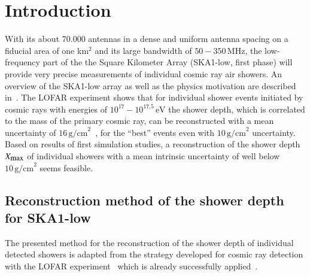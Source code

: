 \documentclass[epj]{webofc}
\newcommand*{\seclab}[1]{\label{sec:#1}}
\begin{document}
\section{Introduction}
\label{intro}
\vspace{-0.17cm}
With its about 70.000 antennas in a dense and uniform antenna spacing on a fiducial area of one km$^2$ and its large bandwidth of $50-350\,\mbox{MHz}$, the low-frequency part of
the the Square Kilometer Array (SKA1-low, first phase) will provide very precise measurements of individual cosmic ray air showers. An overview of the SKA1-low array as well as the physics motivation are described in~\cite{SKAoverview}. 
The LOFAR experiment shows that for individual shower events initiated by cosmic rays with energies of $10^{17}- 10^{17.5}\,\mbox{eV}$ the shower depth, which is correlated to the mass of the primary cosmic ray, can be reconstructed with a mean uncertainty of $16\,\mbox{g/cm}^2$~\cite{LofarNature}, for the ``best'' events even with $10\,\mbox{g/cm}^2$ uncertainty.
Based on results of first simulation studies, a reconstruction of the shower depth $X_{\mbox{\small max}}$ of individual showers with a mean intrinsic uncertainty of well below $10\,\mbox{g/cm}^2$ seems feasible.
%
\vspace{-0.3cm}
%
\subsection{Reconstruction method of the shower depth for SKA1-low}\seclab{subsec1.1}
\vspace{-0.3cm}
The presented method for the reconstruction of the shower depth of individual detected showers is adapted from the strategy developed for cosmic ray detection with the LOFAR experiment~\cite{LofarMethod} which is already successfully applied~\cite{LofarNature}. 
\end{document}
